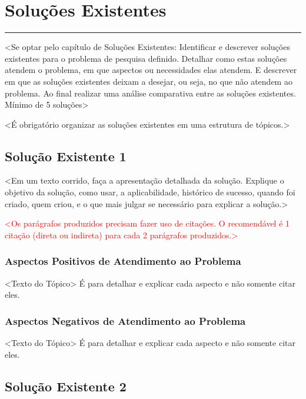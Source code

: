 \section{Soluções Existentes}

\vspace{-0.4cm}

\noindent\rule{\textwidth}{0.7pt}

<Se optar pelo capítulo de Soluções Existentes: Identificar e descrever soluções existentes para o problema de pesquisa definido. Detalhar como estas soluções atendem o problema, em que aspectos ou necessidades elas atendem. E descrever em que as soluções existentes deixam a desejar, ou seja, no que não atendem ao problema. Ao final realizar uma análise comparativa entre as soluções existentes. Mínimo de 5 soluções>

<É obrigatório organizar as soluções existentes em uma estrutura de tópicos.>

\subsection{Solução Existente 1}

<Em um texto corrido, faça a apresentação detalhada da solução. Explique o objetivo da solução, como usar, a aplicabilidade, histórico de sucesso, quando foi criado, quem criou, e o que mais julgar se necessário para explicar a solução.>

\textcolor{red}{
<Os parágrafos produzidos precisam fazer uso de citações.
O recomendável é 1 citação (direta ou indireta)
para cada 2 parágrafos produzidos.>
}

\subsubsection{Aspectos Positivos de Atendimento ao Problema}
<Texto do Tópico> É para detalhar e explicar cada aspecto e não somente citar eles.

\subsubsection{Aspectos Negativos de Atendimento ao Problema}
<Texto do Tópico> É para detalhar e explicar cada aspecto e não somente citar eles.

\subsection{Solução Existente 2}

